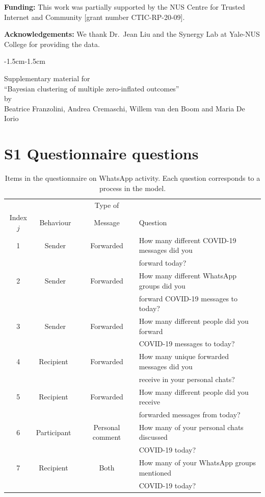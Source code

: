 \documentclass[11pt]{article}
\begin{document}
\textbf{Funding:}{ This work was partially supported by the NUS Centre for Trusted Internet and Community [grant number CTIC-RP-20-09].}

\textbf{Acknowledgements:}{ We thank Dr.~Jean Liu and the Synergy Lab at Yale-NUS College for providing the data.}






\newpage
\begin{changemargin}{-1.5cm}{-1.5cm} 

\begin{center}
\Large{Supplementary material  for \\ ``Bayesian clustering of multiple zero-inflated outcomes''\\ by \\
	\normalsize Beatrice Franzolini, Andrea Cremaschi, Willem van den Boom and Maria De Iorio}
\end{center}

\normalsize

\section*{ S1 Questionnaire questions} \label{ap:q}
\begin{table}[h!] 
	\caption{\label{tab:response} Items in the questionnaire on WhatsApp activity.  Each question corresponds to a process in the model.}
	\begin{tabular}{c|c|c|l}
		&&Type of & \\
		Index $j$& Behaviour & Message&Question\\
		\hline\hline
		1&Sender&Forwarded&\small{How many different COVID-19 messages did you }\\
		&&&\small{ forward today?}\\
		2&Sender&Forwarded&\small{How many different WhatsApp groups did you }\\
		&&&\small{ forward COVID-19 messages to today?}\\
		3&Sender&Forwarded&\small{How many different people did you forward }\\
		&&&\small{ COVID-19 messages to today?}\\
		4&Recipient &Forwarded&\small{How many unique forwarded messages did you }\\
		&&&\small{ receive in your personal chats?}\\
		5&Recipient &Forwarded&\small{How many different people did you receive }\\
		&&&\small{ forwarded messages from today?}\\
		6&Participant &Personal comment&\small{How many of your personal chats discussed }\\
		&&&\small{ COVID-19 today?}\\
		7&Recipient &Both&\small{How many of your WhatsApp groups mentioned}\\
		&&&\small{ COVID-19 today?}
	\end{tabular}
\end{table}


\end{changemargin}
\end{document}
